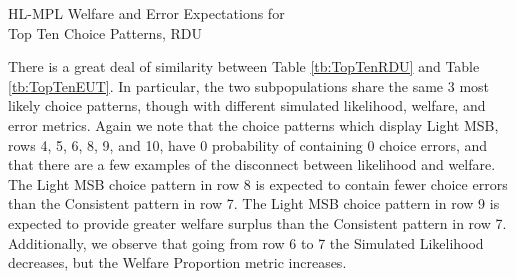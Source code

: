 \documentclass[../main.tex]{subfiles}
\begin{document}
\begin{table}[ht]
	\centering
	\caption{HL-MPL Welfare and Error Expectations for\\Top Ten Choice Patterns, RDU}
	\label{tb:TopTenRDU}
	\begin{adjustbox}{width=1\textwidth}
	\end{adjustbox}
\end{table}

There is a great deal of similarity between Table \ref{tb:TopTenRDU} and Table \ref{tb:TopTenEUT}.
In particular, the two subpopulations share the same $3$ most likely choice patterns, though with different simulated likelihood, welfare, and error metrics.
Again we note that the choice patterns which display Light MSB, rows 4, 5, 6, 8, 9, and 10, have $0$ probability of containing $0$ choice errors, and that there are a few examples of the disconnect between likelihood and welfare.
The Light MSB choice pattern in row 8 is expected to contain fewer choice errors than the Consistent pattern in row 7.
The Light MSB choice pattern in row 9 is expected to provide greater welfare surplus than the Consistent pattern in row 7.
Additionally, we observe that going from row 6 to 7 the Simulated Likelihood decreases, but the Welfare Proportion metric increases.
\end{document}
